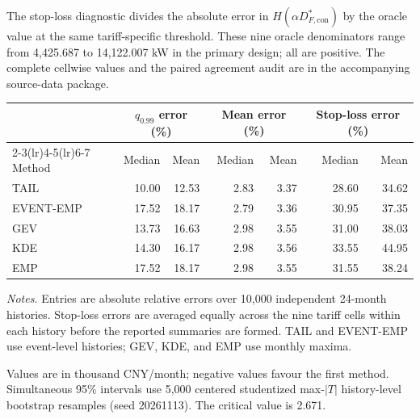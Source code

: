 \documentclass[]{interact}
\providecommand{\tablebodyfont}{\small}
\providecommand{\tablefootnotefont}{\small}
\begin{document}
The stop-loss diagnostic divides the absolute error in
$H(\alpha D^*_{F,\mathrm{con}})$ by the oracle value at the same
tariff-specific threshold. These nine oracle denominators range from
4,425.687 to 14,122.007 kW in the primary design; all are positive.
The complete cellwise values and the paired agreement audit are in
the accompanying source-data package.

\begingroup
\centering
{}
\label{tab:si-fidelity}
{\tablebodyfont
\setlength{\tabcolsep}{4pt}
\renewcommand{\arraystretch}{1.15}
\begin{tabular*}{\linewidth}{@{\extracolsep{\fill}}lrrrrrr@{}}
\toprule
&\multicolumn{2}{c}{$q_{0.99}$ error (\%)}&\multicolumn{2}{c}{Mean error (\%)}&\multicolumn{2}{c}{Stop-loss error (\%)}\\
\cmidrule(lr){2-3}\cmidrule(lr){4-5}\cmidrule(lr){6-7}
Method & Median & Mean & Median & Mean & Median & Mean\\
\midrule
TAIL & 10.00 & 12.53 & 2.83 & 3.37 & 28.60 & 34.62\\
EVENT-EMP & 17.52 & 18.17 & 2.79 & 3.36 & 30.95 & 37.35\\
GEV & 13.73 & 16.63 & 2.98 & 3.55 & 31.00 & 38.03\\
KDE & 14.30 & 16.17 & 2.98 & 3.56 & 33.55 & 44.95\\
EMP & 17.52 & 18.17 & 2.98 & 3.55 & 31.55 & 38.24\\\bottomrule
\end{tabular*}}
\par\smallskip
{\tablefootnotefont\textit{Notes.}
Entries are absolute relative errors over 10,000 independent 24-month
histories. Stop-loss errors are averaged equally across the nine tariff
cells within each history before the reported summaries are formed.
TAIL and EVENT-EMP use event-level histories; GEV, KDE, and EMP use
monthly maxima.}
\endgroup




\begin{table}[ht]
\centering\small
\caption{Simultaneous intervals for six focal matched-information regret contrasts.}
\label{tab:focal-maxt}
\par\smallskip\footnotesize Values are in thousand CNY/month; negative values favour the first method. Simultaneous 95\% intervals use 5,000 centered studentized max-$|T|$ history-level bootstrap resamples (seed 20261113). The critical value is 2.671.
\end{table}
\end{document}
